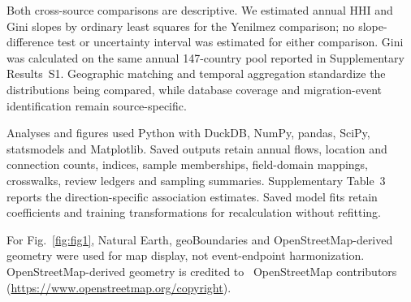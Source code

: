 Both cross-source comparisons are descriptive. We estimated annual HHI and Gini slopes by ordinary least squares for the Yenilmez comparison; no slope-difference test or uncertainty interval was estimated for either comparison. Gini was calculated on the same annual 147-country pool reported in Supplementary Results~S1. Geographic matching and temporal aggregation standardize the distributions being compared, while database coverage and migration-event identification remain source-specific.

Analyses and figures used Python with DuckDB, NumPy, pandas, SciPy, statsmodels and Matplotlib. Saved outputs retain annual flows, location and connection counts, indices, sample memberships, field-domain mappings, crosswalks, review ledgers and sampling summaries. Supplementary Table~3 reports the direction-specific association estimates. Saved model fits retain coefficients and training transformations for recalculation without refitting.

For Fig.~\ref{fig:fig1}, Natural Earth, geoBoundaries and OpenStreetMap-derived geometry were used for map display, not event-endpoint harmonization. OpenStreetMap-derived geometry is credited to \textcopyright\ OpenStreetMap contributors (\url{https://www.openstreetmap.org/copyright}).
